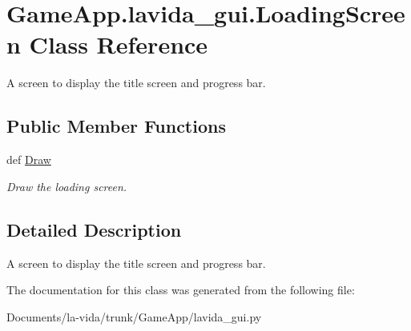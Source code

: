 \hypertarget{classGameApp_1_1lavida__gui_1_1LoadingScreen}{
\section{GameApp.lavida\_\-gui.LoadingScreen Class Reference}
\label{classGameApp_1_1lavida__gui_1_1LoadingScreen}
}
A screen to display the title screen and progress bar.  


\subsection*{Public Member Functions}
\begin{CompactItemize}
\item 
\hypertarget{classGameApp_1_1lavida__gui_1_1LoadingScreen_0ad7509f1e6ca14900f8bf5b4f7f8d65}{
def \hyperlink{classGameApp_1_1lavida__gui_1_1LoadingScreen_0ad7509f1e6ca14900f8bf5b4f7f8d65}{Draw}}
\label{classGameApp_1_1lavida__gui_1_1LoadingScreen_0ad7509f1e6ca14900f8bf5b4f7f8d65}

\begin{CompactList}\small\item\em Draw the loading screen. \item\end{CompactList}\end{CompactItemize}


\subsection{Detailed Description}
A screen to display the title screen and progress bar. 

The documentation for this class was generated from the following file:\begin{CompactItemize}
\item 
Documents/la-vida/trunk/GameApp/lavida\_\-gui.py\end{CompactItemize}

